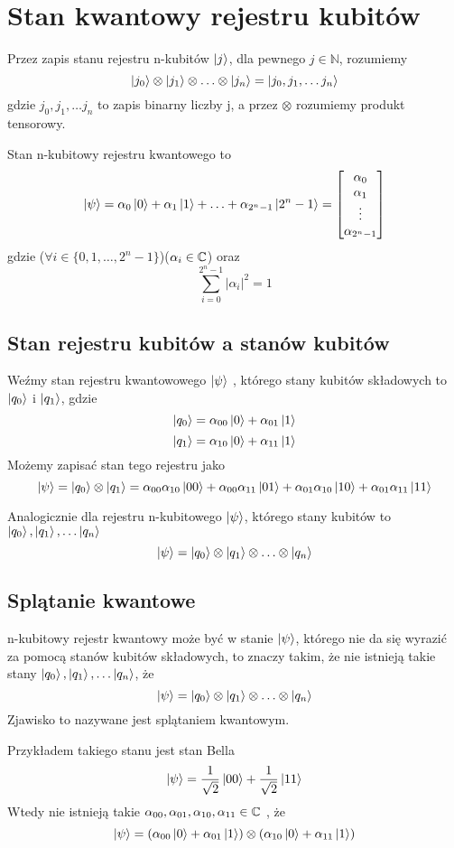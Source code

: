 \section{Stan kwantowy rejestru kubitów}
\begin{definition}
    Przez zapis stanu rejestru n-kubitów $\ket{j}$, dla pewnego $j \in \mathbb{N}$, rozumiemy 
    \[\ket{j_0} \otimes \ket{j_1} \otimes \ldots \otimes \ket{j_n} = \ket{j_0, j_1, \ldots j_n}\]
    gdzie $j_0, j_1, \ldots j_n$ to zapis binarny liczby j, a przez $\otimes$ rozumiemy produkt tensorowy.
\end{definition}
Stan n-kubitowy rejestru kwantowego to
\[
    \ket{\psi} 
    = 
    \alpha_0 \ket{0} + \alpha_1 \ket{1} + \ldots + \alpha_{2^{n} - 1} \ket{2^{n} - 1}
    =
    \begin{bmatrix}
        \alpha_{0} \\
        \alpha_{1} \\
        \vdots \\
        \alpha_{2^n-1}
    \end{bmatrix}
\]
gdzie ($\forall i \in \{0, 1, \ldots, 2^{n} - 1 \}$)($\alpha_i \in \mathbb{C}$) oraz
\[\sum^{2^{n} - 1}_{i = 0} \left|\alpha_i\right|^{2} = 1\]
\subsection{Stan rejestru kubitów a stanów kubitów}
Weźmy stan rejestru kwantowowego $\ket{\psi}$ , którego stany kubitów składowych to $\ket{q_0}$ i $\ket{q_1}$, gdzie
\[\ket{q_0} = \alpha_{00}\ket{0} + \alpha_{01}\ket{1}\]
\[\ket{q_1} = \alpha_{10}\ket{0} + \alpha_{11}\ket{1}\]
Możemy zapisać stan tego rejestru jako
\[\ket{\psi} = \ket{q_0} \otimes \ket{q_1} = \alpha_{00}\alpha_{10}\ket{00} + \alpha_{00}\alpha_{11}\ket{01} + \alpha_{01}\alpha_{10}\ket{10} + \alpha_{01}\alpha_{11}\ket{11}\]
\par Analogicznie dla rejestru n-kubitowego $\ket{\psi}$, którego stany kubitów to $\ket{q_0}, \ket{q_1}, \ldots \ket{q_n}$
\[\ket{\psi} = \ket{q_0} \otimes \ket{q_1} \otimes \ldots \otimes \ket{q_n}\]
\subsection{Splątanie kwantowe}
n-kubitowy rejestr kwantowy może być w stanie $\ket{\psi}$, którego nie da się wyrazić za pomocą stanów kubitów składowych, to znaczy takim, że nie istnieją takie stany $\ket{q_0}, \ket{q_1}, \ldots \ket{q_n}$, że
\[\ket{\psi} = \ket{q_0} \otimes \ket{q_1} \otimes \ldots \otimes \ket{q_n}\]
Zjawisko to nazywane jest splątaniem kwantowym.
\par Przykładem takiego stanu jest stan Bella
\[\ket{\psi} = \frac{1}{\sqrt{2}}\ket{00} + \frac{1}{\sqrt{2}}\ket{11}\]
Wtedy nie istnieją takie $\alpha_{00}, \alpha_{01}, \alpha_{10}, \alpha_{11} \in \mathbb{C}$ , że
\[\ket{\psi} = (\alpha_{00}\ket{0} + \alpha_{01}\ket{1}) \otimes (\alpha_{10}\ket{0} + \alpha_{11}\ket{1})\]
